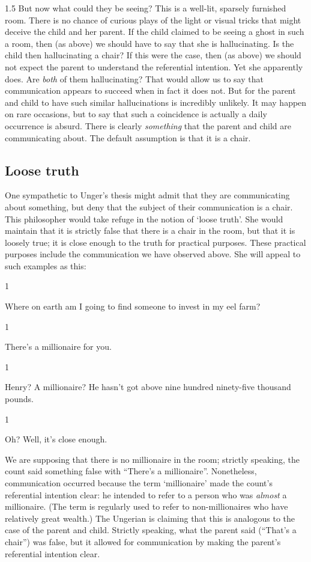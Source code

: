 \documentclass[11pt]{article}
\newcommand{\stage}[3]%
{%
	\begin{spacing}{1}%
	\vspace{0pt}
		\begin{description}[style=nextline, parsep=0pt, leftmargin=15mm, itemindent=-10mm, font=\mdseries]
			\item[\textsc{#1} \emph{#2}] #3
		\end{description}%
	\end{spacing}%
}
\begin{document}
\begin{spacing}{1.5}
But now what could they be seeing? This is a well-lit, sparsely furnished room.  There is no chance of curious plays of the light or visual tricks that might deceive the child and her parent.  If the child claimed to be seeing a ghost in such a room, then (as above) we should have to say that she is hallucinating.  Is the child then hallucinating a chair? If this were the case, then (as above) we should not expect the parent to understand the referential intention.  Yet she apparently does.  Are {\em both} of them hallucinating? That would allow us to say that communication appears to succeed when in fact it does not.  But for the parent and child to have such similar hallucinations is incredibly unlikely.  It may happen on rare occasions, but to say that such a coincidence is actually a daily occurrence is absurd.  There is clearly {\em something} that the parent and child are communicating about.  The default assumption is that it is a chair.

\subsection{Loose truth}
\label{loose-u}
One sympathetic to Unger's thesis might admit that they are communicating about something, but deny that the subject of their communication is a chair.  This philosopher would take refuge in the notion of `loose truth'.  She would maintain that it is strictly false that there is a chair in the room, but that it is loosely true; it is close enough to the truth for practical purposes.  These practical purposes include the communication we have observed above.  She will appeal to such examples as this:

\stage{Countess}{}{Where on earth am I going to find someone to invest in my eel farm?}

\stage{Count}{(pointing)}{There's a millionaire for you.}

\stage{Countess}{(incredulous)}{Henry? A millionaire? He hasn't got above nine hundred ninety-five thousand pounds.}

\stage{Count}{}{Oh? Well, it's close enough.}

We are supposing that there is no millionaire in the room; strictly speaking, the count said something false with ``There's a millionaire''.  Nonetheless, communication occurred because the term `millionaire' made the count's referential intention clear: he intended to refer to a person who was {\em almost} a millionaire.  (The term is regularly used to refer to non-millionaires who have relatively great wealth.) The Ungerian is claiming that this is analogous to the case of the parent and child.  Strictly speaking, what the parent said (``That's a chair'') was false, but it allowed for communication by making the parent's referential intention clear.


\end{spacing}
\end{document}
